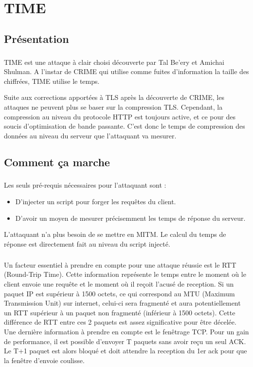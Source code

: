 \chapter{TIME}
\label{chapter:time}


\section{Présentation}
\paragraph{}
TIME est une attaque à clair choisi découverte par Tal Be'ery et Amichai Shulman. A l'instar de CRIME qui utilise comme fuites d'information la taille des chiffrées, TIME utilise le temps.

Suite aux corrections apportées à TLS après la découverte de CRIME, les attaques ne peuvent plus se baser sur la compression TLS. Cependant, la compression au niveau du protocole HTTP est toujours active, et ce pour des soucis d'optimisation de bande passante. C'est donc le temps de compression des données au niveau du serveur que l'attaquant va mesurer.

\section{Comment ça marche}
\paragraph{}
Les seuls pré-requis nécessaires pour l'attaquant sont :
\begin{itemize}
  \item D'injecter un script pour forger les requêtes du client.
  \item D'avoir un moyen de mesurer précisemment les temps de réponse du serveur.
\end{itemize}

L'attaquant n'a plus besoin de se mettre en MITM. Le calcul du temps de réponse est directement fait au niveau du script injecté.

\paragraph{}
Un facteur essentiel à prendre en compte pour une attaque réussie est le RTT (Round-Trip Time). Cette information représente le temps entre le moment où le client envoie une requête et le moment où il reçoit l'acusé de reception. Si un paquet IP est supérieur à 1500 octets, ce qui correspond au MTU (Maximum Transmission Unit) sur internet, celui-ci  sera fragmenté et aura potentiellement un RTT supérieur à un paquet non fragmenté (inférieur à 1500 octets). Cette différence de RTT entre ces 2 paquets est assez significative pour être décelée. Une dernière information à prendre en compte est le fenêtrage TCP. Pour un gain de performance, il est possible d'envoyer T paquets sans avoir reçu un seul ACK. Le T+1 paquet est alors bloqué et doit attendre la reception du 1er ack pour que la fenêtre d'envoie coulisse.\\

